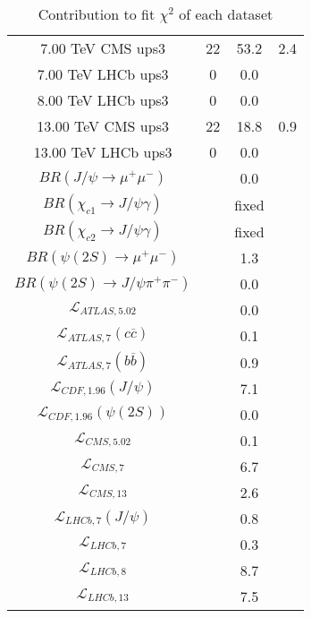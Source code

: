 \begin{table}[h!]
\begin{tabular}{c|c|c|c}
7.00 TeV CMS ups3 & 22 & 53.2 & 2.4 \\
7.00 TeV LHCb ups3 & 0 & 0.0 &  \\
8.00 TeV LHCb ups3 & 0 & 0.0 &  \\
13.00 TeV CMS ups3 & 22 & 18.8 & 0.9 \\
13.00 TeV LHCb ups3 & 0 & 0.0 &  \\
\hline
$BR(J/\psi\rightarrow\mu^+\mu^-)$ &  & 0.0 &  \\
$BR(\chi_{c1}\rightarrow J/\psi\gamma)$ &  & fixed & \\
$BR(\chi_{c2}\rightarrow J/\psi\gamma)$ &  & fixed & \\
$BR(\psi(2S)\rightarrow\mu^+\mu^-)$ &  & 1.3 &  \\
$BR(\psi(2S)\rightarrow J/\psi\pi^+\pi^-)$ &  & 0.0 &  \\
$\mathcal L_{ATLAS,5.02}$ &  & 0.0 &  \\
$\mathcal L_{ATLAS,7}(c\overline c)$ &  & 0.1 &  \\
$\mathcal L_{ATLAS,7}(b\overline b)$ &  & 0.9 &  \\
$\mathcal L_{CDF,1.96}(J/\psi)$ &  & 7.1 &  \\
$\mathcal L_{CDF,1.96}(\psi(2S))$ &  & 0.0 &  \\
$\mathcal L_{CMS,5.02}$ &  & 0.1 &  \\
$\mathcal L_{CMS,7}$ &  & 6.7 &  \\
$\mathcal L_{CMS,13}$ &  & 2.6 &  \\
$\mathcal L_{LHCb,7}(J/\psi)$ &  & 0.8 &  \\
$\mathcal L_{LHCb,7}$ &  & 0.3 &  \\
$\mathcal L_{LHCb,8}$ &  & 8.7 &  \\
$\mathcal L_{LHCb,13}$ &  & 7.5 &  \\
\end{tabular}
\caption{Contribution to fit $\chi^2$ of each dataset}
\end{table}
